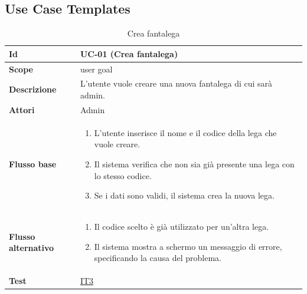 
\subsection{Use Case Templates}

\begin{table}[H]
\caption{Crea fantalega}
\label{UC-01}

\begin{tabularx}{\textwidth}{|l|X|}
\hline
\textbf{Id} & UC-01 (Crea fantalega) \\
\hline
\textbf{Scope} & user goal \\
\hline
\textbf{Descrizione} & L'utente vuole creare una nuova fantalega di cui sarà admin. \\
\hline
\textbf{Attori} & Admin \\
\hline
\textbf{Flusso base} &
\begin{enumerate}[leftmargin=*]
    \item L'utente inserisce il nome e il codice della lega che vuole creare.
    \item Il sistema verifica che non sia già presente una lega con lo stesso codice.
    \item Se i dati sono validi, il sistema crea la nuova lega.
\end{enumerate} \\
\hline
\textbf{Flusso alternativo} &
\begin{enumerate}[leftmargin=*,label=2.\arabic*]
    \item Il codice scelto è già utilizzato per un'altra lega.
    \item Il sistema mostra a schermo un messaggio di errore, specificando la causa del problema.
\end{enumerate} \\
\hline
\textbf{Test} & \hyperref[IT3]{IT3} \\
\hline
\end{tabularx}

\end{table}



